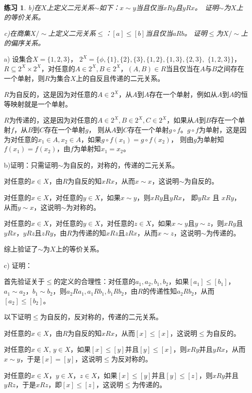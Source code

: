 \documentclass{article}
\newtheorem{Exercise}{练习}
\begin{document}
\begin{CJK*}{UTF8}{gbsn}
\begin{Exercise}
b)在$X$上定义二元关系$\sim$如下：$x\sim y$当且仅当$x R y$且$y R x$。　证明$\sim$为$X$上的等价关系。

c)在商集$X/\sim$上定义二元关系$\leq$：$[a]\leq [b]$当且仅当$aRb$。
证明$\leq$为$X/\sim$上的偏序关系。  
\end{Exercise}
 a) 设集合$X=\{1,2,3\}$，
$2^X=\{\phi,\{1\},\{2\},\{3\},\{1,2\},\{1,3\},\{2,3\},$ $\{1,2,3\}\}$，
$R\subseteq 2^X\times 2^X$，对任意的$A\in 2^X,B\in 2^X$，$(A,B)\in R$当且仅当在$A$与$B$之间存在一个单射，则$R$为集合$X$上的自反且传递的二元关系。

$R$为自反的，这是因为对任意的$A\in 2^X$，从$A$到$A$存在一个单射，例如从$A$到$A$的恒等映射就是一个单射。

$R$为传递的，这是因为对任意的$A\in 2^X, B\in 2^X, C\in 2^X$，如果从$A$到$B$存在一个单射$f$，从$B$到$C$存在一个单射$g$，
则从$A$到$C$存在一个单射$g\circ f$。$g\circ f$为单射，这是因为对任意的$x_1\in A,x_2\in A$，如果$g\circ f(x_1)=g\circ f(x_2)$，
则由$g$为单射知$f(x_1)=f(x_2)$，由$f$为单射知$x_1=x_2$。

b)证明：只需证明$\sim$为自反的，对称的，传递的二元关系。

  对任意的$x\in X$，由$R$为自反的知$xRx$，从而$x\sim x$，这说明$\sim$为自反的。

  对任意的$x\in X$，对任意的$y\in X$，如果$x\sim y$，则$xRy$且$yRx$， 
  即$yRx$ 且 $xRy$， 从而$y\sim x$，这说明$\sim$为对称的。

  对任意的$x\in X$，对任意的$y\in X$，对任意的$z\in X$，如果$x\sim y$且$y\sim z$，则$xRy$且$yRx$，$yRz$且$zRy$，由$R$为传递的知$xRz$且$zRx$，从而$x\sim z$，这说明$\sim$为传递的。

  综上验证了$\sim$为$X$上的等价关系。

  c) 证明：

首先验证关于$\leq$的定义的合理性：对任意的$a_1,a_2,b_1,b_2$，如果$[a_1]\leq [b_1]$，
$a_1\sim a_2$，$b_1\sim b_2$，则$a_2 R a_1, a_1 R b_1, b_1 R b_2$，由$R$的传递性知$a_2 R b_2$，从而$[a_2]\leq [b_2]$。

以下证明$\leq$为自反的，反对称的，传递的二元关系。

  对任意的$x\in X$，由$R$为自反的知$xRx$，从而$[x]\leq [x]$，这说明$\leq$为自反的。

  对任意的$x\in X$, $y\in X$，如果$[x]\leq [y]$并且$[y]\leq [x]$，则$xRy$并且$yRx$，从而$x\sim y$，于是$[x]=[y]$，这说明$\leq$为反对称的。

  对任意的$x\in X$，$y\in X$，$z\in X$，如果$[x] \leq [y]$并且$[y] \leq [z]$，则$xRy$并且$yRz$，于是$xRz$，即$[x]\leq [z]$，这说明$\leq$为传递的。


\end{CJK*}
\end{document}
